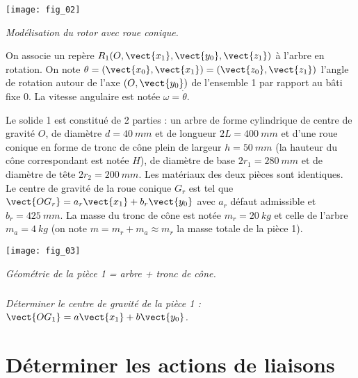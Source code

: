 \begin{multicols}{2}
\begin{center}
\texttt{[image: fig\_02]}

\textit{Modélisation du rotor avec roue conique.}
\end{center}

On associe un repère $R_1(O,\vect{x_1},\vect{y_0},\vect{z_1})$ à l'arbre en rotation. On note $\theta=(\vect{x_0},\vect{x_1})=(\vect{z_0},\vect{z_1})$ l'angle de rotation autour de l'axe $(O,\vect{y_0})$ de l'ensemble 1 par rapport au bâti fixe 0. La vitesse angulaire est notée $\omega=\dot{\theta}$. 

Le solide 1 est constitué de 2 parties : un arbre de forme cylindrique de centre de gravité $O$, de diamètre $d=\SI{40}{mm}$ et de longueur $2L=\SI{400}{mm}$ et d'une roue conique en forme de tronc de cône plein de largeur $h=\SI{50}{mm}$ (la hauteur du cône correspondant est notée $H$), de diamètre de base $2r_1=\SI{280}{mm}$ et de diamètre de tête $2r_2=\SI{200}{mm}$. Les matériaux des deux pièces sont identiques. Le centre de gravité de la roue conique $G_r$ est tel que $\vect{OG_r}=a_r \vect{x_1}+b_r\vect{y_0}$ avec $a_r$ défaut admissible et $b_r=\SI{425}{mm}$. La masse du tronc de cône est notée $m_r=\SI{20}{kg}$ et celle de l'arbre $m_a=\SI{4}{kg}$ (on note $m=m_r+m_a\approx m_r$ la masse totale de la pièce 1).



\begin{center}
\texttt{[image: fig\_03]}

\textit{Géométrie de la pièce 1 = arbre + tronc de cône.}
\end{center}
%
%
%

\subparagraph{}
\textit{Déterminer le centre de gravité de la pièce 1 : $\vect{OG_1}=a \vect{x_1}+b \vect{y_0}$.}


\section*{Déterminer les actions de liaisons\\}


\end{multicols}

